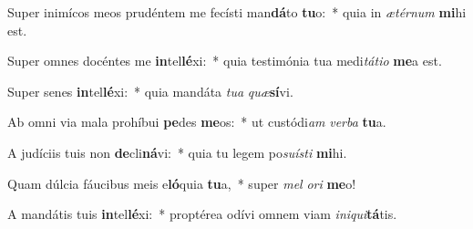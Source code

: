 \item Super inimícos meos prudéntem me fecísti man\textbf{dá}to \textbf{tu}o:~* quia in \textit{æ}\textit{tér}\textit{num} \textbf{mi}hi est.
\item Super omnes docéntes me \textbf{in}tel\textbf{lé}xi:~* quia testimónia tua medi\textit{tá}\textit{ti}\textit{o} \textbf{me}a est.
\item Super senes \textbf{in}tel\textbf{lé}xi:~* quia mandáta \textit{tu}\textit{a} \textit{quæ}\textbf{sí}vi.
\item Ab omni via mala prohíbui \textbf{pe}des \textbf{me}os:~* ut custódi\textit{am} \textit{ver}\textit{ba} \textbf{tu}a.
\item A judíciis tuis non \textbf{de}cli\textbf{ná}vi:~* quia tu legem po\textit{su}\textit{ís}\textit{ti} \textbf{mi}hi.
\item Quam dúlcia fáucibus meis e\textbf{ló}quia \textbf{tu}a,~* super \textit{mel} \textit{o}\textit{ri} \textbf{me}o!
\item A mandátis tuis \textbf{in}tel\textbf{lé}xi:~* proptérea odívi omnem viam \textit{in}\textit{i}\textit{qui}\textbf{tá}tis.
